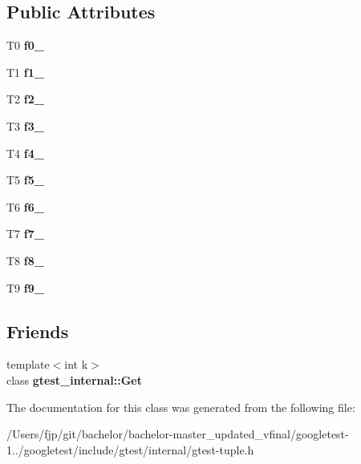 \subsection*{Public Attributes}
\begin{DoxyCompactItemize}
\item 
\mbox{\label{classstd_1_1tr1_1_1tuple_a771b1d99e8800fb284acd04bca838cbb}} 
T0 {\bfseries f0\+\_\+}
\item 
\mbox{\label{classstd_1_1tr1_1_1tuple_a7cccf899dedc626c51fa4f6921d0ac52}} 
T1 {\bfseries f1\+\_\+}
\item 
\mbox{\label{classstd_1_1tr1_1_1tuple_aaec06c27366502dc332ef96878628f84}} 
T2 {\bfseries f2\+\_\+}
\item 
\mbox{\label{classstd_1_1tr1_1_1tuple_ad4d3673e0d5c07c392c02e335fe978ff}} 
T3 {\bfseries f3\+\_\+}
\item 
\mbox{\label{classstd_1_1tr1_1_1tuple_ab662f1051c2302d065796383848db6c4}} 
T4 {\bfseries f4\+\_\+}
\item 
\mbox{\label{classstd_1_1tr1_1_1tuple_a32d8cd6f180c0a77d83733fc65423657}} 
T5 {\bfseries f5\+\_\+}
\item 
\mbox{\label{classstd_1_1tr1_1_1tuple_a597beab3af3f95c84408491ab14632b0}} 
T6 {\bfseries f6\+\_\+}
\item 
\mbox{\label{classstd_1_1tr1_1_1tuple_a7c28780e616d382833e844f62672c6bc}} 
T7 {\bfseries f7\+\_\+}
\item 
\mbox{\label{classstd_1_1tr1_1_1tuple_ae859012c83943e54e035a4a32089ccb6}} 
T8 {\bfseries f8\+\_\+}
\item 
\mbox{\label{classstd_1_1tr1_1_1tuple_a336d5e582fd34e45ec88c78d473671dd}} 
T9 {\bfseries f9\+\_\+}
\end{DoxyCompactItemize}
\subsection*{Friends}
\begin{DoxyCompactItemize}
\item 
\mbox{\label{classstd_1_1tr1_1_1tuple_aeeed38755abdaa78587dd1eac9ccc950}} 
{\footnotesize template$<$int k$>$ }\\class {\bfseries gtest\+\_\+internal\+::\+Get}
\end{DoxyCompactItemize}


The documentation for this class was generated from the following file\+:\begin{DoxyCompactItemize}
\item 
/\+Users/fjp/git/bachelor/bachelor-\/master\+\_\+updated\+\_\+vfinal/googletest-\/1../googletest/include/gtest/internal/gtest-\/tuple.\+h\end{DoxyCompactItemize}
